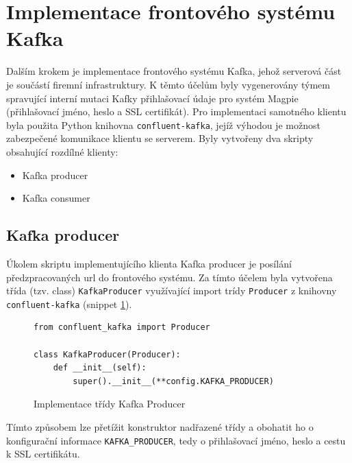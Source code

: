 \documentclass[thesis=M,czech,hidelinks]{FITthesis}[2013/05/06]
\begin{document}
\section{Implementace frontového systému Kafka}

Dalším krokem je implementace frontového systému Kafka, jehož serverová část je součástí firemní infrastruktury. K těmto účelům byly vygenerovány týmem spravující interní mutaci Kafky přihlašovací údaje pro systém Magpie (přihlašovací jméno, heslo a SSL certifikát). Pro implementaci samotného klientu byla použita Python knihovna \texttt{confluent-kafka}\cite{confluent-kafka}, jejíž výhodou je možnost zabezpečené komunikace klientu se serverem. Byly vytvořeny dva skripty obsahující rozdílné klienty:
\begin{itemize}
	\item Kafka producer
	\item Kafka consumer
\end{itemize}


\subsection{Kafka producer} \label{sec:kafkaproducer}
Úkolem skriptu implementujícího klienta Kafka producer je posílání předzpracovaných url do frontového systému. Za tímto účelem byla vytvořena třída (tzv. class) \texttt{KafkaProducer} využívající import trídy \texttt{Producer} z knihovny \texttt{confluent-kafka} (snippet \ref{snip:kafkaproducer}).
\begin{figure}[h]               
	\begin{verbatim}
from confluent_kafka import Producer

class KafkaProducer(Producer):
    def __init__(self):
        super().__init__(**config.KAFKA_PRODUCER)
	\end{verbatim}      
	\caption{Implementace třídy Kafka Producer}
	\label{snip:kafkaproducer}
\end{figure}
Tímto způsobem lze přetížit konstruktor nadřazené třídy a obohatit ho o konfigurační informace \texttt{KAFKA_PRODUCER}, tedy o přihlašovací jméno, heslo a cestu k SSL certifikátu.
\end{document}
